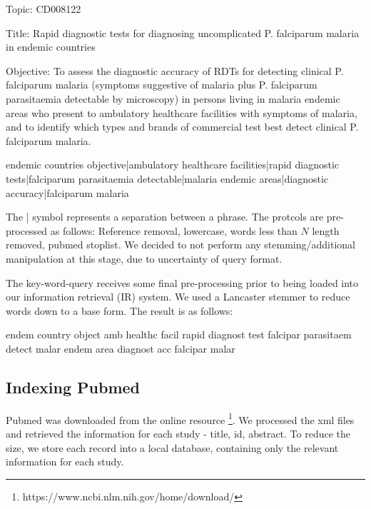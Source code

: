 \begin{tcolorbox}

Topic: CD008122 

Title: Rapid diagnostic tests for diagnosing uncomplicated P. falciparum malaria in endemic countries 

Objective: To assess the diagnostic accuracy of RDTs for detecting clinical P. falciparum malaria (symptoms suggestive of malaria plus P. falciparum parasitaemia detectable by microscopy) in persons living in malaria endemic areas who present to ambulatory healthcare facilities with symptoms of malaria, and to identify which types and brands of commercial test best detect clinical P. falciparum malaria.

\end{tcolorbox}

 
 
\begin{tcolorbox}

endemic countries objective|ambulatory healthcare facilities|rapid diagnostic tests|falciparum parasitaemia detectable|malaria endemic areas|diagnostic accuracy|falciparum malaria

\end{tcolorbox}

The | symbol represents a separation between a phrase. The protcols are pre-processed as follows: Reference removal, lowercase, words less than $N$ length removed, pubmed stoplist. We decided to not perform any stemming/additional manipulation at this stage, due to uncertainty of query format.

The key-word-query receives some final pre-processing prior to being loaded into our information retrieval (IR) system. We used a Lancaster stemmer to reduce words down to a base form. The result is as follows:

\begin{tcolorbox}

endem country object amb healthc facil rapid diagnost test falcipar parasitaem detect malar endem area diagnost acc falcipar malar

\end{tcolorbox}

\subsection{Indexing Pubmed}

Pubmed was downloaded from the online resource \footnote{https://www.ncbi.nlm.nih.gov/home/download/}. We processed the xml files and retrieved the information for each study - title, id, abstract. To reduce the size, we store each record into a local database, containing only the relevant information for each study.

